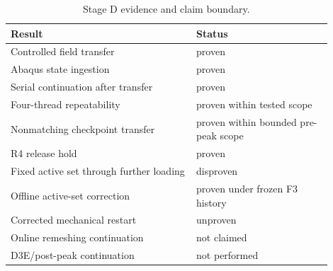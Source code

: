 \begin{table}[htbp]
\centering
\caption{Stage D evidence and claim boundary.}
\label{tab:stage-d-claims}
\begin{tabular}{p{0.52\linewidth}p{0.38\linewidth}}
\hline
Result & Status \\
\hline
Controlled field transfer & proven \\
Abaqus state ingestion & proven \\
Serial continuation after transfer & proven \\
Four-thread repeatability & proven within tested scope \\
Nonmatching checkpoint transfer & proven within bounded pre-peak scope \\
R4 release hold & proven \\
Fixed active set through further loading & disproven \\
Offline active-set correction & proven under frozen F3 history \\
Corrected mechanical restart & unproven \\
Online remeshing continuation & not claimed \\
D3E/post-peak continuation & not performed \\
\hline
\end{tabular}
\end{table}
